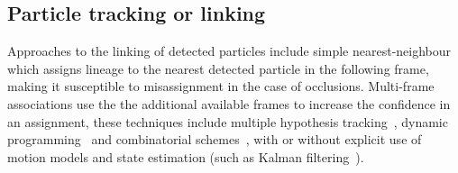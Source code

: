 \subsection{Particle tracking or linking}

Approaches to the linking of detected particles include simple nearest-neighbour\cite{crockerMethodsDigitalVideo1996} which assigns lineage to the nearest detected particle in the following frame, making it susceptible to misassignment in the case of occlusions.
Multi-frame associations use the the additional available frames to increase the confidence in an assignment, these techniques include multiple hypothesis tracking~\cite{coraluppiRecursiveTrackFusion2004}, dynamic programming~\cite{rinkRabConversionMechanism2005} and combinatorial schemes~\cite{sbalzariniFeaturePointTracking2005}, with or without explicit use of motion models and state estimation
(such as Kalman filtering~\cite{kuAutomatedTrackingSystem2007}).
%



